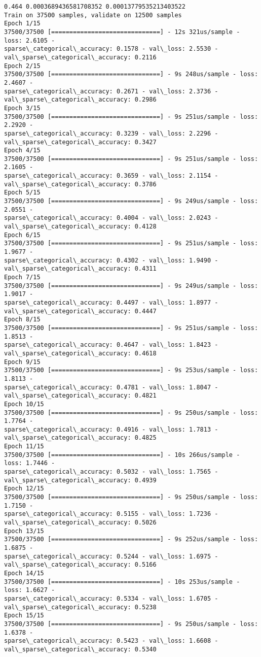 \documentclass[11pt]{article}
\begin{document}
    \begin{Verbatim}[commandchars=\\\{\}]
0.464 0.0003689436581708352 0.00013779535213403522
Train on 37500 samples, validate on 12500 samples
Epoch 1/15
37500/37500 [==============================] - 12s 321us/sample - loss: 2.6105 -
sparse\_categorical\_accuracy: 0.1578 - val\_loss: 2.5530 -
val\_sparse\_categorical\_accuracy: 0.2116
Epoch 2/15
37500/37500 [==============================] - 9s 248us/sample - loss: 2.4607 -
sparse\_categorical\_accuracy: 0.2671 - val\_loss: 2.3736 -
val\_sparse\_categorical\_accuracy: 0.2986
Epoch 3/15
37500/37500 [==============================] - 9s 251us/sample - loss: 2.2920 -
sparse\_categorical\_accuracy: 0.3239 - val\_loss: 2.2296 -
val\_sparse\_categorical\_accuracy: 0.3427
Epoch 4/15
37500/37500 [==============================] - 9s 251us/sample - loss: 2.1605 -
sparse\_categorical\_accuracy: 0.3659 - val\_loss: 2.1154 -
val\_sparse\_categorical\_accuracy: 0.3786
Epoch 5/15
37500/37500 [==============================] - 9s 249us/sample - loss: 2.0551 -
sparse\_categorical\_accuracy: 0.4004 - val\_loss: 2.0243 -
val\_sparse\_categorical\_accuracy: 0.4128
Epoch 6/15
37500/37500 [==============================] - 9s 251us/sample - loss: 1.9677 -
sparse\_categorical\_accuracy: 0.4302 - val\_loss: 1.9490 -
val\_sparse\_categorical\_accuracy: 0.4311
Epoch 7/15
37500/37500 [==============================] - 9s 249us/sample - loss: 1.9017 -
sparse\_categorical\_accuracy: 0.4497 - val\_loss: 1.8977 -
val\_sparse\_categorical\_accuracy: 0.4447
Epoch 8/15
37500/37500 [==============================] - 9s 251us/sample - loss: 1.8513 -
sparse\_categorical\_accuracy: 0.4647 - val\_loss: 1.8423 -
val\_sparse\_categorical\_accuracy: 0.4618
Epoch 9/15
37500/37500 [==============================] - 9s 253us/sample - loss: 1.8113 -
sparse\_categorical\_accuracy: 0.4781 - val\_loss: 1.8047 -
val\_sparse\_categorical\_accuracy: 0.4821
Epoch 10/15
37500/37500 [==============================] - 9s 250us/sample - loss: 1.7764 -
sparse\_categorical\_accuracy: 0.4916 - val\_loss: 1.7813 -
val\_sparse\_categorical\_accuracy: 0.4825
Epoch 11/15
37500/37500 [==============================] - 10s 266us/sample - loss: 1.7446 -
sparse\_categorical\_accuracy: 0.5032 - val\_loss: 1.7565 -
val\_sparse\_categorical\_accuracy: 0.4939
Epoch 12/15
37500/37500 [==============================] - 9s 250us/sample - loss: 1.7150 -
sparse\_categorical\_accuracy: 0.5155 - val\_loss: 1.7236 -
val\_sparse\_categorical\_accuracy: 0.5026
Epoch 13/15
37500/37500 [==============================] - 9s 252us/sample - loss: 1.6875 -
sparse\_categorical\_accuracy: 0.5244 - val\_loss: 1.6975 -
val\_sparse\_categorical\_accuracy: 0.5166
Epoch 14/15
37500/37500 [==============================] - 10s 253us/sample - loss: 1.6627 -
sparse\_categorical\_accuracy: 0.5334 - val\_loss: 1.6705 -
val\_sparse\_categorical\_accuracy: 0.5238
Epoch 15/15
37500/37500 [==============================] - 9s 250us/sample - loss: 1.6378 -
sparse\_categorical\_accuracy: 0.5423 - val\_loss: 1.6608 -
val\_sparse\_categorical\_accuracy: 0.5340
    \end{Verbatim}
\end{document}
